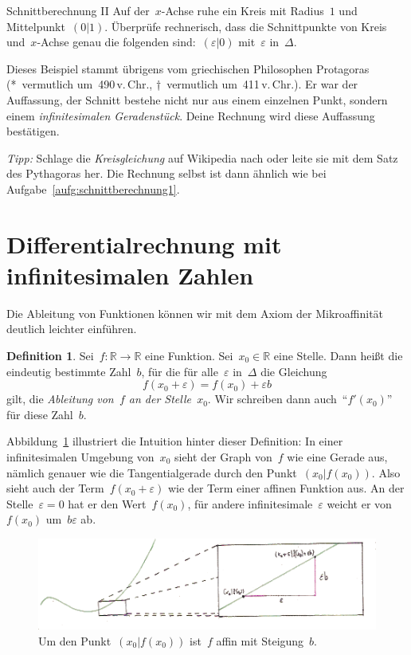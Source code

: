 \documentclass[twoside]{../zirkelblatt}
\newcommand{\RR}{\mathbb{R}}
\theoremstyle{definition}
\newtheorem{defn}{Definition}[section]
\theoremstyle{plain}
\theoremstyle{remark}
\begin{document}
\begin{aufgabeShaded}{Schnittberechnung II}
Auf der~$x$-Achse ruhe ein Kreis mit Radius~$1$ und Mittelpunkt~$(0|1)$.
Überprüfe rechnerisch, dass die Schnittpunkte von Kreis und~$x$-Achse genau die
folgenden sind:~$(\varepsilon|0)$ mit~$\varepsilon$ in~$\Delta$.

Dieses Beispiel stammt übrigens vom griechischen Philosophen Protagoras
(*~vermutlich um~490\,v.\,Chr., †~vermutlich um~411\,v.\,Chr.). Er
war der Auffassung, der Schnitt bestehe nicht nur aus einem einzelnen Punkt,
sondern einem \emph{infinitesimalen Geradenstück}. Deine Rechnung wird diese
Auffassung bestätigen.

\emph{Tipp:} Schlage die \emph{Kreisgleichung} auf Wikipedia nach oder leite
sie mit dem Satz des Pythagoras her. Die Rechnung selbst ist dann ähnlich wie
bei Aufgabe~\ref{aufg:schnittberechnung1}.
\end{aufgabeShaded}


\section{Differentialrechnung mit infinitesimalen Zahlen}

Die Ableitung von Funktionen können wir mit dem Axiom der Mikroaffinität
deutlich leichter einführen.

\begin{defn}\label{defn:sdg-ableitung}
Sei~$f : \RR \to \RR$ eine Funktion. Sei~$x_0 \in \RR$ eine Stelle.
Dann heißt die eindeutig bestimmte Zahl~$b$, für die für alle~$\varepsilon$
in~$\Delta$ die Gleichung
\[ f(x_0 + \varepsilon) = f(x_0) + \varepsilon b \]
gilt, die \emph{Ableitung von~$f$ an der Stelle~$x_0$}. Wir schreiben dann
auch~"`$f'(x_0)$"' für diese Zahl~$b$.\end{defn}

Abbildung~\ref{fig:ableitung-sdg} illustriert die Intuition hinter dieser
Definition: In einer infinitesimalen Umgebung von~$x_0$ sieht der Graph von~$f$
wie eine Gerade aus, nämlich genauer wie die Tangentialgerade durch den
Punkt~$(x_0|f(x_0))$. Also sieht auch der Term~$f(x_0 + \varepsilon)$ wie der
Term einer affinen Funktion aus. An der Stelle~$\varepsilon = 0$ hat er den
Wert~$f(x_0)$, für andere infinitesimale~$\varepsilon$ weicht er von~$f(x_0)$
um~$b \varepsilon$ ab.

\begin{figure}[b]
  \centering
  \includegraphics{sdg-ableitung}
  \caption{\label{fig:ableitung-sdg}Um den Punkt~$(x_0|f(x_0))$ ist~$f$ affin
  mit Steigung~$b$.}
\end{figure}
\end{document}
